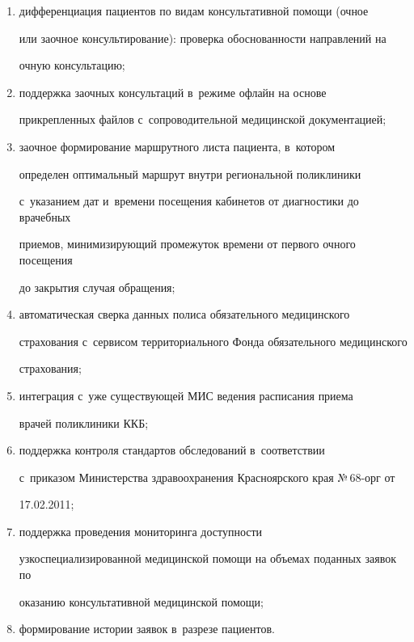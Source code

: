   \begin{enumerate}[(1)]


  \item  дифференциация пациентов по видам консультативной помощи (очное 


или заочное консультирование): проверка обоснованности направлений на 


очную консультацию;\\[-14pt]


  \item поддержка заочных консультаций в~режиме офлайн на основе 


прикрепленных файлов с~сопроводительной медицинской документацией;\\[-14pt]


  \item заочное формирование маршрутного листа пациента, в~котором 


определен оптимальный маршрут внутри региональной поликлиники 


с~указанием дат и~времени посещения кабинетов от диагностики до врачебных 


приемов, минимизирующий промежуток времени от первого очного посещения 


до закрытия случая обращения;\\[-14pt]


  \item автоматическая сверка данных полиса обязательного медицинского 


страхования с~сервисом территориального Фонда обязательного медицинского 


страхования;\\[-14pt]


  \item интеграция с~уже существующей МИС ведения расписания приема 


врачей поликлиники ККБ;\\[-14pt]


  \item поддержка контроля стандартов обследований в~соответствии 


с~приказом Министерства здравоохранения Красноярского края №\,68-орг от 


17.02.2011;\\[-14pt]


  \item поддержка проведения мониторинга доступности 


узкоспециализированной медицинской помощи на объемах поданных заявок по 


оказанию консультативной медицинской помощи;\\[-14pt]


  \item формирование истории заявок в~разрезе пациентов.


  \end{enumerate}


